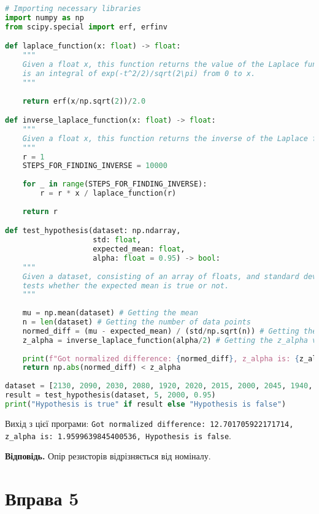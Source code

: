 \documentclass{../hw_template}
\begin{document}
\begin{lstlisting}[language=Python]
# Importing necessary libraries
import numpy as np 
from scipy.special import erf, erfinv

def laplace_function(x: float) -> float:
    """
    Given a float x, this function returns the value of the Laplace function at x, which
    is an integral of exp(-t^2/2)/sqrt(2\pi) from 0 to x.
    """
    
    return erf(x/np.sqrt(2))/2.0

def inverse_laplace_function(x: float) -> float:
    """
    Given a float x, this function returns the inverse of the Laplace function at x
    """
    r = 1
    STEPS_FOR_FINDING_INVERSE = 10000
    
    for _ in range(STEPS_FOR_FINDING_INVERSE):
        r = r * x / laplace_function(r)
    
    return r

def test_hypothesis(dataset: np.ndarray, 
                    std: float,
                    expected_mean: float,
                    alpha: float = 0.95) -> bool:
    """
    Given a dataset, consisting of an array of floats, and standard deviation, 
    tests whether the expected mean is true or not.
    """
    
    mu = np.mean(dataset) # Getting the mean
    n = len(dataset) # Getting the number of data points
    normed_diff = (mu - expected_mean) / (std/np.sqrt(n)) # Getting the normalized difference
    z_alpha = inverse_laplace_function(alpha/2) # Getting the z_alpha value
    
    print(f"Got normalized difference: {normed_diff}, z_alpha is: {z_alpha}")
    return np.abs(normed_diff) < z_alpha
    
dataset = [2130, 2090, 2030, 2080, 1920, 2020, 2015, 2000, 2045, 1940, 1980, 1970]
result = test_hypothesis(dataset, 5, 2000, 0.95)
print("Hypothesis is true" if result else "Hypothesis is false")
\end{lstlisting}

Вихід з цієї програми: \texttt{Got normalized difference: 12.701705922171714, z\_alpha is: 1.9599639845400536, Hypothesis is false}.

\textbf{Відповідь.} Опір резисторів відрізняється від номіналу.

\pagebreak

\section{Вправа 5}
\end{document}

